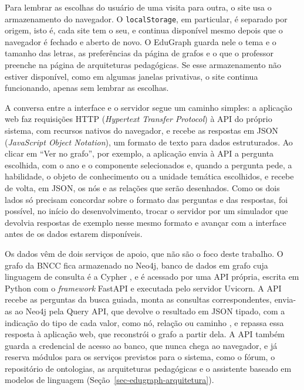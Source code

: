 Para lembrar as escolhas do usuário de uma visita para outra, o site usa o armazenamento do navegador. O \texttt{localStorage}, em particular, é separado por origem, isto é, cada site tem o seu, e continua disponível mesmo depois que o navegador é fechado e aberto de novo. O EduGraph guarda nele o tema e o tamanho das letras, as preferências da página de grafos e o que o professor preenche na página de arquiteturas pedagógicas. Se esse armazenamento não estiver disponível, como em algumas janelas privativas, o site continua funcionando, apenas sem lembrar as escolhas.

A conversa entre a interface e o servidor segue um caminho simples: a aplicação web faz requisições HTTP (\textit{Hypertext Transfer Protocol}) à API do próprio sistema, com recursos nativos do navegador, e recebe as respostas em JSON (\textit{JavaScript Object Notation}), um formato de texto para dados estruturados. Ao clicar em ``Ver no grafo'', por exemplo, a aplicação envia à API a pergunta escolhida, com o ano e o componente selecionados e, quando a pergunta pede, a habilidade, o objeto de conhecimento ou a unidade temática escolhidos, e recebe de volta, em JSON, os nós e as relações que serão desenhados. Como os dois lados só precisam concordar sobre o formato das perguntas e das respostas, foi possível, no início do desenvolvimento, trocar o servidor por um simulador que devolvia respostas de exemplo nesse mesmo formato e avançar com a interface antes de os dados estarem disponíveis.

Os dados vêm de dois serviços de apoio, que não são o foco deste trabalho. O grafo da BNCC fica armazenado no Neo4j, banco de dados em grafo cuja linguagem de consulta é a Cypher \cite{angles2017foundations}, e é acessado por uma API própria, escrita em Python com o \textit{framework} FastAPI e executada pelo servidor Uvicorn. A API recebe as perguntas da busca guiada, monta as consultas correspondentes, envia-as ao Neo4j pela Query API, que devolve o resultado em JSON tipado, com a indicação do tipo de cada valor, como nó, relação ou caminho \cite{neo4j2026queryapi}, e repassa essa resposta à aplicação web, que reconstrói o grafo a partir dela. A API também guarda a credencial de acesso ao banco, que nunca chega ao navegador, e já reserva módulos para os serviços previstos para o sistema, como o fórum, o repositório de ontologias, as arquiteturas pedagógicas e o assistente baseado em modelos de linguagem (Seção~\ref{sec-edugraph-arquitetura}).


